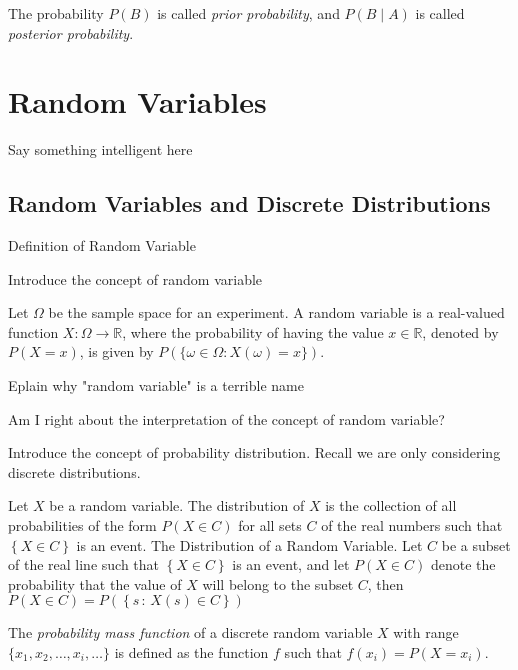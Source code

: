 The probability $P\left( B \right)$ is called \emph{prior probability}, and $P\left( B\mid A \right)$ is called \emph{posterior probability}.

%
%

\section{Random Variables}
\label{sec:probability_random_variables}

{\color{red} Say something intelligent here}


\subsection{Random Variables and Discrete Distributions}

{\color{red} Definition of Random Variable}

{\color{red} Introduce the concept of random variable}

\begin{definition}
Let $\Omega$ be the sample space for an experiment. A random variable is a real-valued function $X : \Omega \rightarrow \mathbb{R}$, where the probability of having the value $x \in \mathbb{R}$, denoted by $P(X=x)$, is given by $P(\{ \omega \in \Omega : X(\omega) = x\})$.
\end{definition}

{\color{red} Eplain why "random variable" is a terrible name}

{\color{red} Am I right about the interpretation of the concept of random variable?}

{\color{red} Introduce the concept of probability distribution. Recall we are only considering discrete distributions.}

\begin{definition}
Let $X$ be a random variable. The distribution of $X$ is the collection of all probabilities of the form $P\left(X\in C\right)$ for all sets $C$ of the real numbers such that $\left\{ X\in C\right\}$  is an event. The Distribution of a Random Variable. Let $C$ be a subset of the real line such that $\left\{ X\in C\right\}$  is an event, and let $P\left(X\in C\right)$ denote the probability that the value of $X$ will belong to the subset $C$, then $P\left(X\in C\right)=P\left(\left\{ s\,:\,X\left(s\right)\in C\right\} \right)$

The \emph{probability mass function} of a discrete random variable $X$ with range $\{ x_1, x_2, \ldots, x_i, \ldots \}$ is defined as the function $f$ such that $f(x_i) = P(X=x_i)$.
\end{definition}

